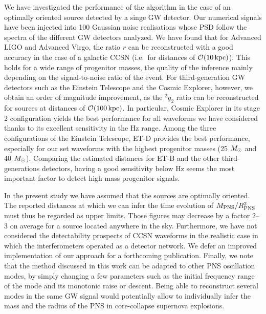 We have investigated the performance of the algorithm in the case of an optimally oriented source detected by a singe GW detector. Our numerical signals have been injected into 100 Gaussian noise realisations whose PSD follow the spectra of the different GW detectors analyzed. We have found that for Advanced LIGO and Advanced Virgo, the ratio $r$ can be reconstructed with a good accuracy in the case of a galactic CCSN (i.e.~for distances of ${\cal O}(10\, {\rm kpc})$). This holds for a wide range of progenitor masses, the quality of the inference mainly depending on the signal-to-noise ratio of the event. For third-generation GW detectors such as the Einstein Telescope and the Cosmic Explorer, however, we obtain an order of magnitude improvement, as the $\mbox{}^2g_2$ ratio can be reconstructed for sources at distances of ${\cal O}(\unit[100]{kpc})$. In particular, Cosmic Explorer in its stage 2 configuration yields the best performance for all waveforms we have considered thanks to its excellent sensitivity in the \unit[100-1000]{Hz} range. Among the three configurations of the Einstein Telescope, ET-D provides the best performance, especially for our set waveforms with the highest progenitor masses (25 $M_{\odot}$ and 40 $M_{\odot}$). Comparing the estimated distances for ET-B and the other third-generations detectors, having a good sensitivity below \unit[200]{Hz} seems the most important factor to detect high mass progenitor signals.

In the present study we have assumed that the sources are optimally oriented. The reported distances at which
we can infer the time evolution of $M_{\rm PNS}/R_{\rm PNS}^2$ must thus be regarded as upper limits. Those figures may decrease by a factor 2--3 on average for a source located anywhere in the sky. Furthermore, we have not considered the detectability prospects of  CCSN waveforms in the realistic case in which the  interferometers operated as a detector network. 
We defer an improved implementation of our approach for a forthcoming publication. Finally, we note that the method discussed in this work can be adapted to other PNS oscillation modes, by simply changing a few parameters such as the initial frequency range of the mode and its monotonic raise or descent. Being able to reconstruct several modes in the same GW signal would potentially allow to individually infer the mass and the radius of the PNS in core-collapse supernova explosions.





